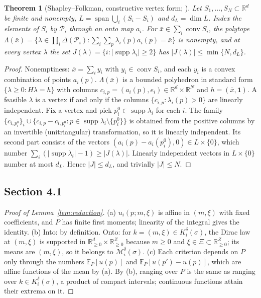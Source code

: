 \documentclass[preprint,12pt]{elsarticle}
\newtheorem{theorem}{Theorem}
\theoremstyle{definition}
\theoremstyle{remark}
\newcommand{\R}{\mathbb{R}}
\newcommand{\E}{\mathbb{E}}
\newcommand{\cP}{\mathcal{P}}
\newcommand{\cM}{\mathcal{M}}
\newcommand{\conv}{\operatorname{conv}}
\newcommand{\spn}{\operatorname{span}}
\newcommand{\supp}{\operatorname{supp}}
\begin{document}
\begin{theorem}[Shapley--Folkman, constructive vertex form; \citealp{Starr1969}]\label{thm:sf}
Let $S_1,\dots,S_N\subset\R^d$ be finite and nonempty, $L=\spn\bigcup_i(S_i-S_i)$ and $d_L=\dim L$. Index the elements of $S_i$ by $\cP_i$ through an onto map $a_i$. For $\bar x\in\sum_i\conv S_i$, the polytope $\Lambda(\bar x)=\{\lambda\in\prod_i\Delta(\cP_i):\sum_i\sum_p\lambda_i(p)a_i(p)=\bar x\}$ is nonempty, and at every vertex $\lambda$ the set $J(\lambda)=\{i:|\supp\lambda_i|\ge2\}$ has $|J(\lambda)|\le\min\{N,d_L\}$.
\end{theorem}
\begin{proof}
Nonemptiness: $\bar x=\sum_iy_i$ with $y_i\in\conv S_i$, and each $y_i$ is a convex combination of points $a_i(p)$. $\Lambda(\bar x)$ is a bounded polyhedron in standard form $\{\lambda\ge0:H\lambda=h\}$ with columns $c_{i,p}=(a_i(p),e_i)\in\R^d\times\R^N$ and $h=(\bar x,\mathbf 1)$. A feasible $\lambda$ is a vertex if and only if the columns $\{c_{i,p}:\lambda_i(p)>0\}$ are linearly independent. Fix a vertex and pick $p_i^0\in\supp\lambda_i$ for each $i$. The family $\{c_{i,p_i^0}\}_i\cup\{c_{i,p}-c_{i,p_i^0}:p\in\supp\lambda_i\setminus\{p_i^0\}\}$ is obtained from the positive columns by an invertible (unitriangular) transformation, so it is linearly independent. Its second part consists of the vectors $(a_i(p)-a_i(p_i^0),0)\in L\times\{0\}$, which number $\sum_i(|\supp\lambda_i|-1)\ge|J(\lambda)|$. Linearly independent vectors in $L\times\{0\}$ number at most $d_L$. Hence $|J|\le d_L$, and trivially $|J|\le N$.
\end{proof}

\subsection{Section 4.1}

\begin{proof}[Proof of Lemma~\ref{lem:reduction}]
(a) $u_i(p;m,\xi)$ is affine in $(m,\xi)$ with fixed coefficients, and $P$ has finite first moments; linearity of the integral gives the identity. (b) Into: by definition. Onto: for $k=(m,\xi)\in K_i^\delta(\sigma)$, the Dirac law at $(m,\xi)$ is supported in $\R^d_{\ge0}\times\R^Z_{\ge0}$ because $m\ge0$ and $\xi\in\Xi\subset\R^Z_{\ge0}$; its means are $(m,\xi)$, so it belongs to $\cM_i^\delta(\sigma)$. (c) Each criterion depends on $P$ only through the numbers $\E_P[u(p)]$ and $\E_P[u(p')-u(p)]$, which are affine functions of the mean by (a). By (b), ranging over $P$ is the same as ranging over $k\in K_i^\delta(\sigma)$, a product of compact intervals; continuous functions attain their extrema on it.
\end{proof}
\end{document}
